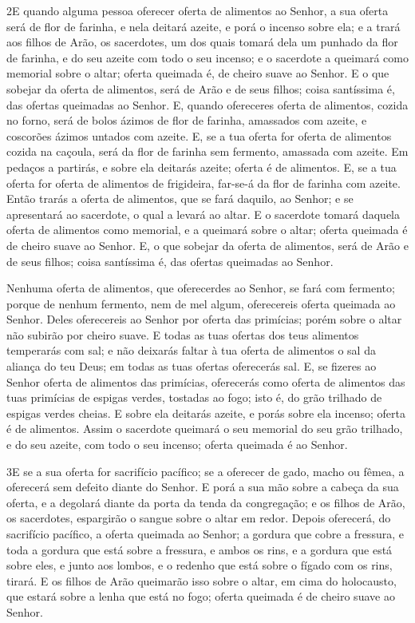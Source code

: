 \lettrine{2} E quando alguma pessoa oferecer oferta de
alimentos ao Senhor, a sua oferta será de flor de farinha, e nela
deitará azeite, e porá o incenso sobre ela; e a trará aos filhos
de Arão, os sacerdotes, um dos quais tomará dela um punhado da flor
de farinha, e do seu azeite com todo o seu incenso; e o sacerdote a
queimará como memorial sobre o altar; oferta queimada é, de cheiro
suave ao Senhor. E o que sobejar da oferta de alimentos, será de
Arão e de seus filhos; coisa santíssima é, das ofertas queimadas ao
Senhor. E, quando ofereceres oferta de alimentos, cozida no
forno, será de bolos ázimos de flor de farinha, amassados com
azeite, e coscorões ázimos untados com azeite. E, se a tua
oferta for oferta de alimentos cozida na caçoula, será da flor de
farinha sem fermento, amassada com azeite. Em pedaços a
partirás, e sobre ela deitarás azeite; oferta é de alimentos. E,
se a tua oferta for oferta de alimentos de frigideira, far-se-á da
flor de farinha com azeite. Então trarás a oferta de alimentos,
que se fará daquilo, ao Senhor; e se apresentará ao sacerdote, o
qual a levará ao altar. E o sacerdote tomará daquela oferta de
alimentos como memorial, e a queimará sobre o altar; oferta queimada
é de cheiro suave ao Senhor. E, o que sobejar da oferta de
alimentos, será de Arão e de seus filhos; coisa santíssima é, das
ofertas queimadas ao Senhor.

Nenhuma oferta de alimentos, que oferecerdes ao Senhor, se fará
com fermento; porque de nenhum fermento, nem de mel algum,
oferecereis oferta queimada ao Senhor. Deles oferecereis ao
Senhor por oferta das primícias; porém sobre o altar não subirão por
cheiro suave. E todas as tuas ofertas dos teus alimentos
temperarás com sal; e não deixarás faltar à tua oferta de alimentos
o sal da aliança do teu Deus; em todas as tuas ofertas oferecerás
sal. E, se fizeres ao Senhor oferta de alimentos das
primícias, oferecerás como oferta de alimentos das tuas primícias de
espigas verdes, tostadas ao fogo; isto é, do grão trilhado de
espigas verdes cheias. E sobre ela deitarás azeite, e porás
sobre ela incenso; oferta é de alimentos. Assim o sacerdote
queimará o seu memorial do seu grão trilhado, e do seu azeite, com
todo o seu incenso; oferta queimada é ao Senhor.

\medskip

\lettrine{3} E se a sua oferta for sacrifício pacífico; se a
oferecer de gado, macho ou fêmea, a oferecerá sem defeito diante do
Senhor. E porá a sua mão sobre a cabeça da sua oferta, e a
degolará diante da porta da tenda da congregação; e os filhos de
Arão, os sacerdotes, espargirão o sangue sobre o altar em redor.
Depois oferecerá, do sacrifício pacífico, a oferta queimada ao
Senhor; a gordura que cobre a fressura, e toda a gordura que está
sobre a fressura, e ambos os rins, e a gordura que está sobre
eles, e junto aos lombos, e o redenho que está sobre o fígado com os
rins, tirará. E os filhos de Arão queimarão isso sobre o altar,
em cima do holocausto, que estará sobre a lenha que está no fogo;
oferta queimada é de cheiro suave ao Senhor.

